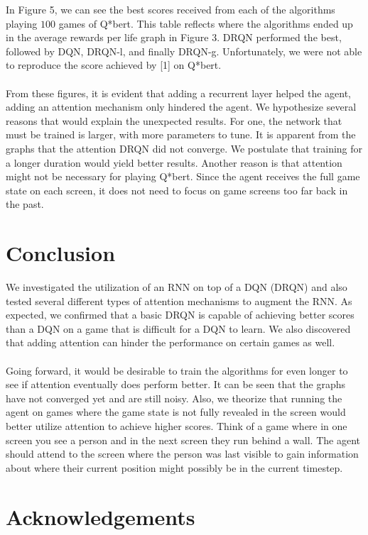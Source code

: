 \documentclass{article}
\begin{document}
In Figure 5, we can see the best scores received from each of the algorithms playing
$100$ games of Q*bert. This table reflects where the algorithms ended up in the
average rewards per life graph in Figure 3. DRQN performed the best, followed
by DQN, DRQN-l, and finally DRQN-g. Unfortunately, we were not able to reproduce the
score achieved by [1] on Q*bert. \\
\\
From these figures, it is evident that adding a recurrent layer helped the
agent, adding an attention mechanism only hindered the agent. We hypothesize
several reasons that would explain the unexpected results. For one, the network that must
be trained is larger, with more parameters to tune. It is apparent from
the graphs that the attention DRQN did not converge. We postulate that  training
for a longer duration would yield better results. Another reason is that attention might not be
necessary for playing Q*bert. Since the agent receives the full game state on each
screen, it does not need to focus on game screens too far back in the past.

\section*{Conclusion}

We investigated the utilization of an RNN on top of a DQN (DRQN) and also tested several different types
of attention mechanisms to augment the RNN. As expected, we confirmed that a basic DRQN is capable of achieving
better scores than a DQN on a game that is difficult for a DQN to learn. We also
discovered that adding attention can hinder the performance on certain games as well. \\
\\
Going forward, it would be desirable to train the algorithms for even longer to see
if attention eventually does perform better. It can be seen that the graphs have
not converged yet and are still noisy. Also, we theorize that running the agent on games
where the game state is not fully revealed in the screen would better utilize
attention to achieve higher scores. Think of a game where in one screen you see
a person and in the next screen they run behind a wall. The agent should attend
to the screen where the person was last visible to gain information about where
their current position might possibly be in the current timestep.

\section*{Acknowledgements}
\end{document}
